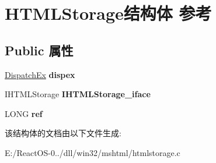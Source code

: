 \hypertarget{struct_h_t_m_l_storage}{}\section{H\+T\+M\+L\+Storage结构体 参考}
\label{struct_h_t_m_l_storage}
\subsection*{Public 属性}
\begin{DoxyCompactItemize}
\item 
\mbox{\label{struct_h_t_m_l_storage_a7d9abd517d57995299ac6e2e395b3f7b}} 
\hyperlink{struct_dispatch_ex}{Dispatch\+Ex} {\bfseries dispex}
\item 
\mbox{\label{struct_h_t_m_l_storage_ad84284f473a7392a6af20bb91df1b667}} 
I\+H\+T\+M\+L\+Storage {\bfseries I\+H\+T\+M\+L\+Storage\+\_\+iface}
\item 
\mbox{\label{struct_h_t_m_l_storage_a3a0c21a77e201f5bfce029d36d2c2d83}} 
L\+O\+NG {\bfseries ref}
\end{DoxyCompactItemize}


该结构体的文档由以下文件生成\+:\begin{DoxyCompactItemize}
\item 
E\+:/\+React\+O\+S-\/0../dll/win32/mshtml/htmlstorage.\+c\end{DoxyCompactItemize}

